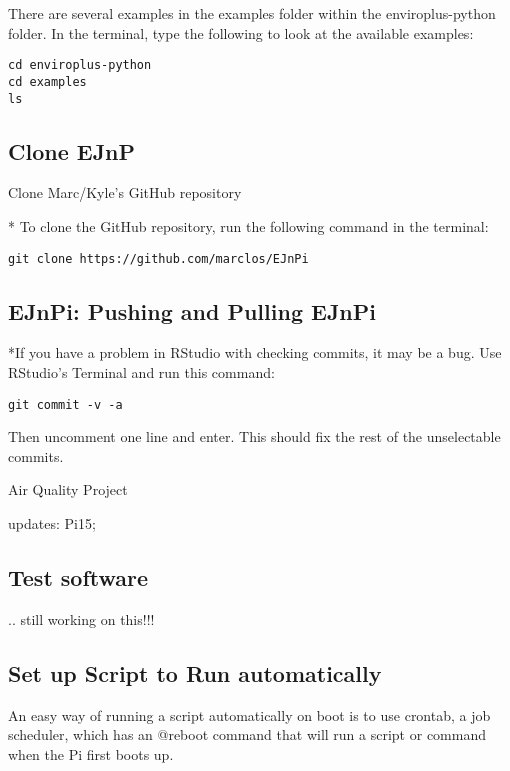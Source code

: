 \documentclass{article}
\begin{document}
There are several examples in the examples folder within the enviroplus-python folder. In the terminal, type the following to look at the available examples:

\begin{verbatim}
cd enviroplus-python
cd examples
ls
\end{verbatim}


\subsection{Clone EJnP}

Clone Marc/Kyle's GitHub repository

* To clone the GitHub repository, run the following command in the terminal:
\begin{verbatim}
git clone https://github.com/marclos/EJnPi
\end{verbatim}



\subsection{EJnPi: Pushing and Pulling EJnPi}


*If you have a problem in RStudio with checking commits, it may be a bug. Use RStudio's Terminal and run this command:

\begin{verbatim}
git commit -v -a
\end{verbatim}

Then uncomment one line and enter. This should fix the rest of the unselectable commits.


Air Quality Project


    





updates: Pi15; 


\subsection{Test software}

.. still working on this!!!


\subsection{Set up Script to Run automatically}


An easy way of running a script automatically on boot is to use crontab, a job scheduler, which has an @reboot command that will run a script or command when the Pi first boots up.
\end{document}
